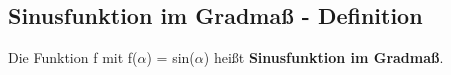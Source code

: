 \documentclass{standalone}
\begin{document}
\subsection{Sinusfunktion im Gradma{\ss} - Definition}

Die Funktion f mit f($\alpha$) = sin($\alpha$) hei{\ss}t \textbf{Sinusfunktion im Gradma{\ss}}.
\end{document}
